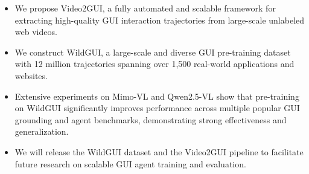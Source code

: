 \documentclass{article}
\theoremstyle{plain}
\theoremstyle{definition}
\theoremstyle{remark}
\begin{document}

\begin{itemize}
    \item We propose Video2GUI, a fully automated and scalable framework for extracting high-quality GUI interaction trajectories from large-scale unlabeled web videos.
    \item We construct WildGUI, a large-scale and diverse GUI pre-training dataset with 12 million trajectories spanning over 1,500 real-world applications and websites.
    \item Extensive experiments on Mimo-VL and Qwen2.5-VL show that pre-training on WildGUI significantly improves performance across multiple popular GUI grounding and agent benchmarks, demonstrating strong effectiveness and generalization.
    \item We will release the WildGUI dataset and the Video2GUI pipeline to facilitate future research on scalable GUI agent training and evaluation.
\end{itemize}
\end{document}
